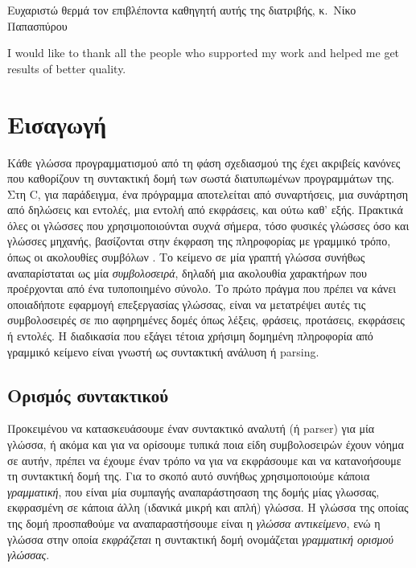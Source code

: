 \documentclass[diploma]{softlab-thesis}
\begin{document}

\begin{acknowledgementsgr}
  Ευχαριστώ θερμά τον επιβλέποντα καθηγητή αυτής της διατριβής,
  κ.~Νίκο Παπασπύρου
\end{acknowledgementsgr}

\begin{acknowledgementsen}
  I would like to thank all the people who supported my work and helped me get
  results of better quality.  
\end{acknowledgementsen}



\tableofcontents
\listoffigures


\mainmatter

\chapter{ Εισαγωγή }

Κάθε γλώσσα προγραμματισμού από τη φάση σχεδιασμού της έχει ακριβείς κανόνες που καθορίζουν τη συντακτική δομή των σωστά διατυπωμένων προγραμμάτων της. \cite{Aho2006}
Στη C, για παράδειγμα, ένα πρόγραμμα αποτελείται από συναρτήσεις, μια συνάρτηση από δηλώσεις και εντολές, μια εντολή από εκφράσεις, και ούτω καθ' εξής.
Πρακτικά όλες οι γλώσσες που χρησιμοποιούνται συχνά σήμερα, τόσο φυσικές γλώσσες όσο και γλώσσες μηχανής, βασίζονται στην έκφραση της πληροφορίας με γραμμικό τρόπο, 
όπως οι ακολουθίες συμβόλων  \cite{Ford2002a}.
Το κείμενο σε μία γραπτή γλώσσα συνήθως αναπαρίσταται ως μία  \textit{ συμβολοσειρά}, δηλαδή μια ακολουθία χαρακτήρων που προέρχονται από ένα τυποποιημένο σύνολο. 
Το πρώτο πράγμα που πρέπει να κάνει οποιαδήποτε εφαρμογή επεξεργασίας γλώσσας, 
είναι να μετατρέψει αυτές τις συμβολοσειρές σε πιο αφηρημένες δομές όπως λέξεις, φράσεις, προτάσεις, εκφράσεις ή εντολές.
Η διαδικασία που εξάγει τέτοια χρήσιμη δομημένη πληροφορία από γραμμικό κείμενο είναι γνωστή ως συντακτική ανάλυση ή parsing.

\section{ Ορισμός συντακτικού}

Προκειμένου να κατασκευάσουμε έναν συντακτικό αναλυτή (ή  parser) για μία γλώσσα, ή ακόμα και για να ορίσουμε τυπικά ποια είδη συμβολοσειρών έχουν νόημα σε αυτήν, πρέπει να έχουμε έναν τρόπο να για να εκφράσουμε και να κατανοήσουμε τη συντακτική δομή της.
Για το σκοπό αυτό συνήθως χρησιμοποιούμε κάποια  \textit{ γραμματική}, που είναι μία συμπαγής αναπαράστησαση της δομής μίας γλωσσας, εκφρασμένη σε κάποια άλλη (ιδανικά μικρή και απλή) γλώσσα.
Η γλώσσα της οποίας της δομή προσπαθούμε να αναπαραστήσουμε είναι η  \textit{ γλώσσα αντικείμενο}, ενώ η γλώσσα στην οποία \textit{ εκφράζεται} η συντακτική δομή ονομάζεται  \textit{γραμματική ορισμού γλώσσας}. 
\end{document}
